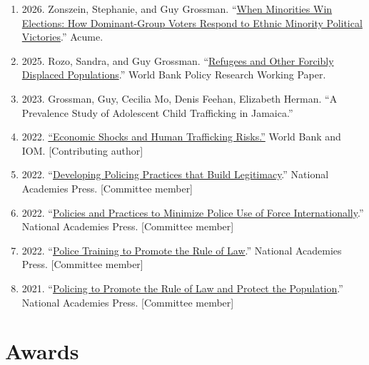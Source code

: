 \documentclass[10pt,a4paper]{article}
\begin{document}
\begin{enumerate}[leftmargin=2em, itemsep=2pt, topsep=4pt]
\item \textcolor{secondary}{2026.} Zonszein, Stephanie, and Guy Grossman. ``\href{https://www.acume.org/r/when-minorities-win-elections-how-dominant-group-voters-respond-to-ethnic-minority-political-victories/}{When Minorities Win Elections: How Dominant-Group Voters Respond to Ethnic Minority Political Victories}.'' Acume.
\item \textcolor{secondary}{2025.} Rozo, Sandra, and Guy Grossman. ``\href{https://documents.worldbank.org/en/publication/documents-reports/documentdetail/099301105192515441}{Refugees and Other Forcibly Displaced Populations}.'' World Bank Policy Research Working Paper.
\item \textcolor{secondary}{2023.} Grossman, Guy, Cecilia Mo, Denis Feehan, Elizabeth Herman. ``A Prevalence Study of Adolescent Child Trafficking in Jamaica.''
\item \textcolor{secondary}{2022.} \href{https://openknowledge.worldbank.org/handle/10986/37261}{``Economic Shocks and Human Trafficking Risks.''} World Bank and IOM. [Contributing author]
\item \textcolor{secondary}{2022.} ``\href{https://bit.ly/3TrDlvQ}{Developing Policing Practices that Build Legitimacy}.'' National Academies Press. [Committee member]
\item \textcolor{secondary}{2022.} ``\href{https://bit.ly/3QLAtsn}{Policies and Practices to Minimize Police Use of Force Internationally}.'' National Academies Press. [Committee member]
\item \textcolor{secondary}{2022.} ``\href{https://bit.ly/3K3XeEh}{Police Training to Promote the Rule of Law}.'' National Academies Press. [Committee member]
\item \textcolor{secondary}{2021.} ``\href{https://bit.ly/3FXuX0W}{Policing to Promote the Rule of Law and Protect the Population}.'' National Academies Press. [Committee member]
\end{enumerate}

\section{Awards}
\end{document}
